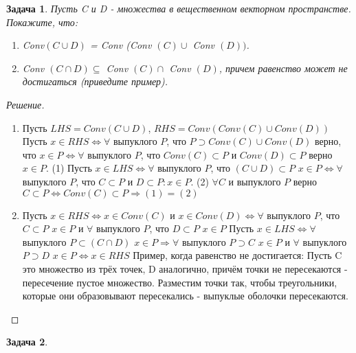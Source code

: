 \documentclass[a4paper]{article}
\newtheorem{problem}{Задача}
\begin{document}
\begin{problem} Пусть C и D - множества в вещественном векторном пространстве. Покажите, что:
\begin{enumerate}[label=(\alph*)]
    \item Conv$(C \cup D)$ = Conv (Conv $(C) \cup$  Conv $(D))$.
    \item Conv $(C \cap D) \subseteq $ Conv $(C) \cap $ Conv $(D)$, причем равенство может не достигаться (приведите пример).
\end{enumerate}
\end{problem}

\begin{proof}[Решение]
\begin{enumerate}[label=(\alph*)]
    \item Пусть $LHS = Conv (C \cup D)$, $RHS = Conv (Conv (C) \cup  Conv (D))$ \newline
        Пусть $x \in RHS \Leftrightarrow \forall$ выпуклого $P$, что $P \supset Conv (C) \cup  Conv (D)$ верно, что $x \in P \Leftrightarrow \forall$ выпуклого $P$, что $Conv(C) \subset P$ и $Conv(D) \subset P$ верно $x \in P$. (1) \newline
        Пусть $x \in LHS \Leftrightarrow \forall$ выпуклого $P$, что $(C \cup D) \subset P$ $x \in P \Leftrightarrow \forall$ выпуклого $P$, что $C \subset P$ и $D \subset P: x \in P $. (2) \newline
        $\forall C$ и выпуклого $P$ верно $C \subset P \Leftrightarrow Conv(C) \subset P \Rightarrow (1) = (2)$
    \item Пусть $x \in RHS \Leftrightarrow x \in Conv(C)$ и $x \in Conv(D) \Leftrightarrow \forall$ выпуклого $P$, что $C \subset P$ $x \in P$ и $\forall$ выпуклого $P$, что $D \subset P$ $x \in P$ \newline
    Пусть $x \in LHS \Leftrightarrow \forall$ выпуклого $P \subset (C \cap D)$ $x \in P \Rightarrow \forall$ выпуклого $P \supset C$ $x \in P$ и $\forall$ выпуклого $P \supset D$ $x \in P \Leftrightarrow x \in RHS$ \newline
    Пример, когда равенство не достигается: Пусть C это множество из трёх точек, D аналогично, причём точки не пересекаются - пересечение пустое множество. Разместим точки так, чтобы треугольники, которые они образовывают пересекались - выпуклые оболочки пересекаются.
\end{enumerate}
\end{proof}

\begin{problem}
\end{problem}
\end{document}
